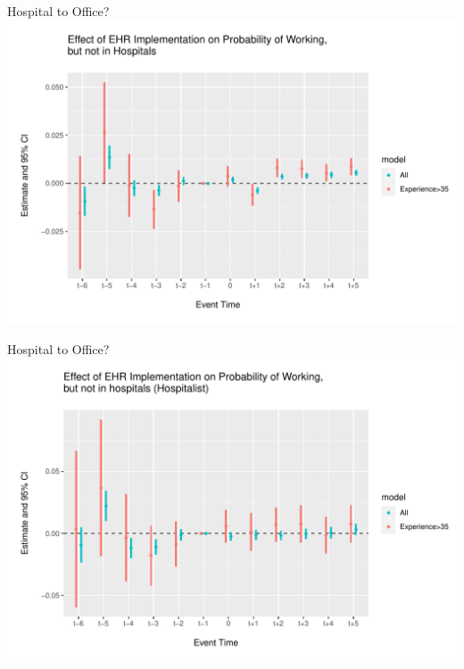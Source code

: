 \documentclass[10pt]{beamer}
\begin{document}
\begin{frame}{Hospital to Office?}
    \centering
    \includegraphics[scale=.5]{Objects/event_plot_office_to_hosp.pdf}
\end{frame}

\begin{frame}{Hospital to Office?}
    \centering
    \includegraphics[scale=.5]{Objects/event_hosp_plot_hosp_to_office.pdf}
\end{frame}
\end{document}
